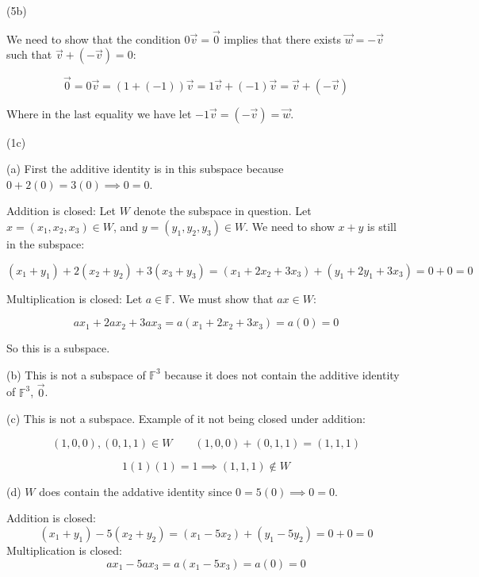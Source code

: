\documentclass{article}
\begin{document}
\vspace{3mm}

\noindent(5b)

\vspace{3mm}

We need to show that the condition $0\vec{v} = \vec{0}$ implies that there exists $\vec{w} = -\vec{v}$ such that $\vec{v} + (-\vec{v}) = 0$:

$$\vec{0} = 0\vec{v} = (1 + (-1))\vec{v} = 1\vec{v} + (-1)\vec{v} = \vec{v} + (-\vec{v})$$

Where in the last equality we have let $-1\vec{v} = (-\vec{v}) =  \vec{w}$.

\vspace{3mm}

\noindent(1c)

\vspace{3mm}

\noindent(a) First the additive identity is in this subspace because $0 + 2(0) = 3(0) \implies 0 = 0$.

\vspace{1mm}
\noindent Addition is closed: Let $W$ denote the subspace in question. Let $x = (x_1, x_2, x_3) \in W$, and $ y = (y_1, y_2, y_3) \in W$. We need to show $x+y$ is still in the subspace:

$$(x_1 + y_1) + 2(x_2 + y_2) + 3(x_3 + y_3) = (x_1 + 2x_2 + 3x_3) + (y_1 + 2y_1 + 3x_3) = 0 + 0 = 0$$

\noindent Multiplication is closed: Let $a\in\mathbb{F}$. We must show that $ax \in W$:

$$ax_1 + 2ax_2 + 3ax_3 = a(x_1 + 2x_2 + 3x_3) = a(0) = 0$$

\noindent So this is a subspace.

\vspace{6mm}

\noindent(b) This is not a subspace of $\mathbb{F}^3$ because it does not contain the additive identity of $\mathbb{F}^3$, $\vec{0}$.

\vspace{3mm}

\noindent(c) This is not a subspace. Example of it not being closed under addition:

$$(1,0,0) , (0, 1, 1) \in W \qquad (1, 0, 0) + (0, 1, 1) = (1, 1, 1)$$

$$1(1)(1) = 1 \implies (1,1,1) \notin W$$


\newpage

\noindent(d) $W$ does contain the addative identity since $0 = 5(0) \implies 0 = 0$.

Addition is closed:
$$(x_1 + y_1) - 5(x_2 + y_2) = (x_1 - 5x_2) + (y_1 - 5y_2) = 0 + 0 = 0$$
Multiplication is closed:
$$ax_1 - 5ax_3 = a(x_1 - 5x_3) = a(0) = 0$$
\end{document}
